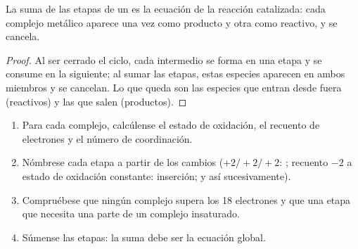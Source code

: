 \begin{proposition}\label{prop:b2:catalytic-cycles:cycle-sum}
La suma de las etapas de un  es la ecuación de la reacción catalizada:
cada complejo metálico aparece una vez como producto y otra como reactivo, y se cancela.
\end{proposition}

\begin{proof}
Al ser cerrado el ciclo, cada intermedio se forma en una etapa y se consume en la siguiente;
al sumar las etapas, estas especies aparecen en ambos miembros y se cancelan. Lo que queda son las
especies que entran desde fuera (reactivos) y las que salen (productos).
\end{proof}

\begin{method}\label{met:b2:catalytic-cycles:read-cycle}
\begin{enumerate}
  \item Para cada complejo, calcúlense el estado de oxidación, el recuento de electrones y el
        número de coordinación.
  \item Nómbrese cada etapa a partir de los cambios ($+2/+2/+2$: ; recuento $-2$ a
        estado de oxidación constante: inserción; y así sucesivamente).
  \item Compruébese que ningún complejo supera los 18 electrones y que una etapa que necesita una 
        parte de un complejo insaturado.
  \item Súmense las etapas: la suma debe ser la ecuación global.
\end{enumerate}
\end{method}

